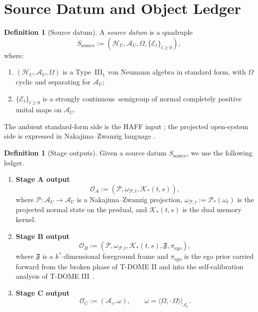 \documentclass[12pt]{article}
\theoremstyle{definition}
\newtheorem{definition}[theorem]{Definition}
\theoremstyle{remark}
\providecommand{\FISourceContinuityPhrase}{strongly continuous}
\providecommand{\FIHeisenbergContinuityRemark}{}
\begin{document}
\section{Source Datum and Object Ledger}\label{sec:ledger}

\begin{definition}[Source datum]
A \emph{source datum} is a quadruple
\[
S_{\mathrm{source}}
:=
(\mathcal H_U,\mathcal A_U,\Omega,\{\mathcal E_t\}_{t\ge 0}),
\]
where:
\begin{enumerate}
\item \((\mathcal H_U,\mathcal A_U,\Omega)\) is a Type~III\(_1\) von
  Neumann algebra in standard form, with \(\Omega\) cyclic and
  separating for \(\mathcal A_U\);
\item \(\{\mathcal E_t\}_{t\ge 0}\) is a \FISourceContinuityPhrase\
  semigroup of normal completely positive unital maps on
  \(\mathcal A_U\).
\end{enumerate}
\end{definition}

\FIHeisenbergContinuityRemark

The ambient standard-form side is the HAFF input
\cite{HAFFD}; the projected open-system side is expressed in
Nakajima--Zwanzig language \cite{Nakajima1958,Zwanzig1960,
BreuerPetruccione2002}.

\begin{definition}[Stage outputs]
Given a source datum \(S_{\mathrm{source}}\), we use the following
ledger.
\begin{enumerate}
\item \textbf{Stage A output}
  \[
  \mathcal O_A
  :=
  (\mathcal P,\omega_{\mathcal P,t},\mathcal K_*(t,s)),
  \]
  where \(\mathcal P:\mathcal A_U\to\mathcal A_U\) is a
  Nakajima--Zwanzig projection,
  \(\omega_{\mathcal P,t}:=\mathcal P_*(\omega_t)\) is the projected
  normal state on the predual, and \(\mathcal K_*(t,s)\) is the dual
  memory kernel.
\item \textbf{Stage B output}
  \[
  \mathcal O_B
  :=
  (\mathcal P,\omega_{\mathcal P,t},\mathcal K_*(t,s),\mathfrak F,\pi_{\mathrm{ego}}),
  \]
  where \(\mathfrak F\) is a \(k^*\)-dimensional foreground frame and
  \(\pi_{\mathrm{ego}}\) is the ego prior carried forward from the
  broken phase of T-DOME II and into the self-calibration analysis of
  T-DOME III~\cite{TDOMEII,TDOMEIII}.
\item \textbf{Stage C output}
  \[
  \mathcal O_C
  :=
  (\mathcal A_c,\omega),
  \qquad
  \omega=\langle\Omega,\cdot\,\Omega\rangle|_{\mathcal A_c}.
  \]
\end{enumerate}
\end{definition}
\end{document}
